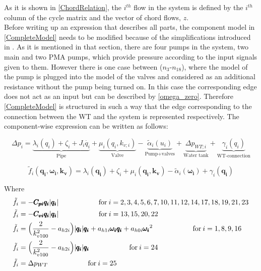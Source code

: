 As it is shown in \eqref{ChordRelation}, the $i^{th}$ flow in the system is defined by the $i^{th}$ column of the cycle matrix and the vector of chord flows, $z$. 
\\
Before writing up an expression that describes all parts, the component model in \eqref{CompleteModel} needs to be modified because of the simplifications introduced in . As it is mentioned in that section, there are four pumps in the system, two main and two PMA pumps, which provide pressure according to the input signals given to them. However there is one case between ($n_3$-$n_{18}$), where the model of the pump is plugged into the model of the valves and considered as an additional resistance without the pump being turned on. In this case the corresponding edge does not act as an input but can be described by \eqref{omega_zero}. Therefore \eqref{CompleteModel} is structured in such a way that the edge corresponding to the connection between the WT and the system is represented respectively. The component-wise expression can be written as follows:

\begin{equation}
\label{CompleteModel_extended}
\Delta p_i = \underbrace{\lambda_i (q_i) + \zeta_i + J_i \dot{q_i}}_\text{Pipe} + \underbrace{\mu_i (q_i, k_{v;i})}_\text{Valve} - \underbrace{\tilde{\alpha}_i(u_i)}_\text{Pump+valves} + \underbrace{\Delta p_{WT;i}}_\text{Water tank} + \underbrace{\gamma_i (q_i)}_\text{WT-connection}
\end{equation}


\begin{equation}
  \tilde{f}_i(\pmb{q_{i}}, \pmb{\omega_i}, \pmb{k_v}) = \lambda_i(\pmb{q_{i}}) + \zeta_i + \mu_i(\pmb{q_{i}}, \pmb{k_v}) - \tilde{\alpha}_i(\pmb{\omega_i}) + \gamma_i (\pmb{q_i})
  \label{ComponentFunction}
\end{equation}

Where\\
\begin{align}
\tilde{f}_i &= -\pmb{C_{pi} q_i} |\pmb{q_i}|  \hskip 2cm  \text{for}\: i = 2,3,4,5,6,7,10,11,12,14,17,18,19,21,23 \\
\tilde{f}_i &= -\pmb{C_{vi} q_i} |\pmb{q_i}|  \hskip 2cm  \text{for}\:i = 13,15,20,22\\
\tilde{f}_i &= \Big(\frac{2}{k_{v100}^2} - a_{h2i}\Big)|\pmb{q_i}| \pmb{q_i}  + a_{h1i} \pmb{\omega_{i}} \pmb{q_i} + a_{h0i}\pmb{{\omega_i}}^2 \hskip 2cm  \text{for}\: i = 1,8,9,16 \\
\tilde{f}_i &= \Big(\frac{2}{k_{v100}^2} - a_{h2i}\Big)|\pmb{q_i}| \pmb{q_i}  \hskip 2cm  \text{for}\: i = 24 \\
\tilde{f}_i &= \Delta p_{WT}  \hskip 2cm  \text{for}\:i = 25
\end{align}

